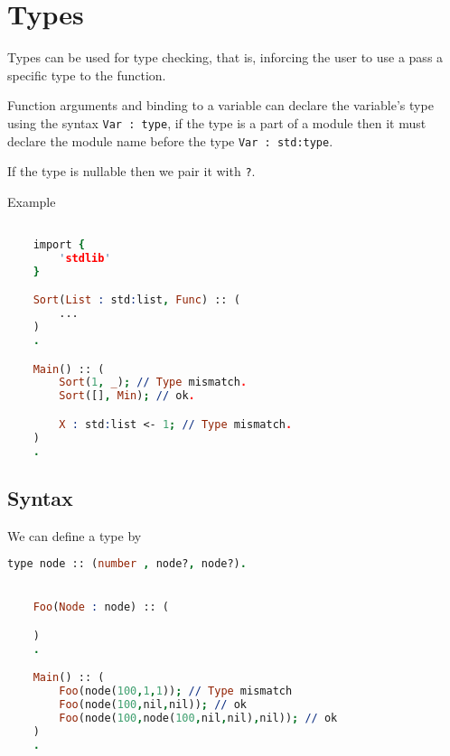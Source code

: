 \section{Types}

Types can be used for type checking, that is, inforcing the user
to use a pass a specific type to the function.

Function arguments and binding to a variable can declare the variable's type 
using the syntax \texttt{Var : type}, if the type is a part of a module
then it must declare the module name before the type \texttt{Var : std:type}.

If the type is nullable then we pair it with \texttt{?}.

Example

\begin{lstlisting}[language = Prolog]

    import {
        'stdlib'
    }

    Sort(List : std:list, Func) :: (
        ...
    )
    .

    Main() :: (
        Sort(1, _); // Type mismatch.
        Sort([], Min); // ok.

        X : std:list <- 1; // Type mismatch.
    )
    .

\end{lstlisting}

\subsection{Syntax}

We can define a type by 

\begin{lstlisting}[language = Prolog]
    type node :: (number , node?, node?).


    Foo(Node : node) :: (

    )
    .

    Main() :: (
        Foo(node(100,1,1)); // Type mismatch
        Foo(node(100,nil,nil)); // ok
        Foo(node(100,node(100,nil,nil),nil)); // ok
    )
    .

\end{lstlisting}


